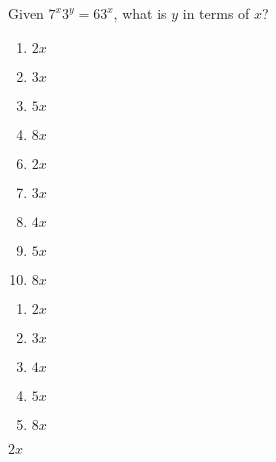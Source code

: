 


  Given $7^{x}3^{y} = 63^x$, what is $y$ in terms of $x$?\\




\ifsat
	\begin{enumerate}[label=\Alph*)]
		\item   $2x$%
		\item  $3x$
		\item  $5x$
		\item   $8x$
	\end{enumerate}
\else
\fi

\ifacteven
	\begin{enumerate}[label=\textbf{\Alph*.},itemsep=\fill,align=left]
		\setcounter{enumii}{5}
		\item   $2x$%
		\item  $3x$
		\item  $4x$
		\addtocounter{enumii}{1}
		\item  $5x$
		\item   $8x$
	\end{enumerate}
\else
\fi

\ifactodd
	\begin{enumerate}[label=\textbf{\Alph*.},itemsep=\fill,align=left]
		\item   $2x$%
		\item  $3x$
		\item  $4x$
		\item  $5x$
		\item   $8x$
	\end{enumerate}
\else
\fi

\ifgridin
   $2x$%
		
\else
\fi

